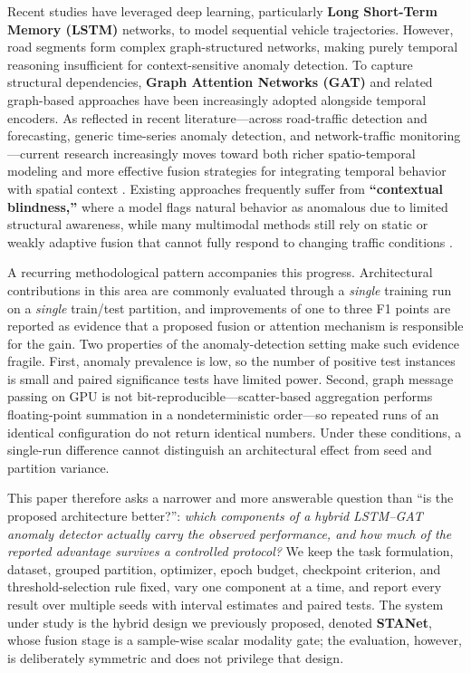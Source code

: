 \documentclass[journal]{IEEEtran}
\begin{document}
Recent studies have leveraged deep learning, particularly \textbf{Long Short-Term Memory (LSTM)} networks, to model sequential vehicle trajectories. However, road segments form complex graph-structured networks, making purely temporal reasoning insufficient for context-sensitive anomaly detection. To capture structural dependencies, \textbf{Graph Attention Networks (GAT)} and related graph-based approaches have been increasingly adopted alongside temporal encoders. As reflected in recent literature---across road-traffic detection and forecasting, generic time-series anomaly detection, and network-traffic monitoring---current research increasingly moves toward both richer spatio-temporal modeling and more effective fusion strategies for integrating temporal behavior with spatial context \cite{huang_multivariate_2024, sun_framework_2025, nguyen_spatiotemporal_2026, liang_anomaly_2025}. Existing approaches frequently suffer from \textbf{``contextual blindness,''} where a model flags natural behavior as anomalous due to limited structural awareness, while many multimodal methods still rely on static or weakly adaptive fusion that cannot fully respond to changing traffic conditions \cite{sun_framework_2025, liang_anomaly_2025}.

A recurring methodological pattern accompanies this progress. Architectural contributions in this area are commonly evaluated through a \emph{single} training run on a \emph{single} train/test partition, and improvements of one to three F1 points are reported as evidence that a proposed fusion or attention mechanism is responsible for the gain. Two properties of the anomaly-detection setting make such evidence fragile. First, anomaly prevalence is low, so the number of positive test instances is small and paired significance tests have limited power. Second, graph message passing on GPU is not bit-reproducible---scatter-based aggregation performs floating-point summation in a nondeterministic order---so repeated runs of an identical configuration do not return identical numbers. Under these conditions, a single-run difference cannot distinguish an architectural effect from seed and partition variance.

This paper therefore asks a narrower and more answerable question than ``is the proposed architecture better?'': \emph{which components of a hybrid LSTM--GAT anomaly detector actually carry the observed performance, and how much of the reported advantage survives a controlled protocol?} We keep the task formulation, dataset, grouped partition, optimizer, epoch budget, checkpoint criterion, and threshold-selection rule fixed, vary one component at a time, and report every result over multiple seeds with interval estimates and paired tests. The system under study is the hybrid design we previously proposed, denoted \textbf{STANet}, whose fusion stage is a sample-wise scalar modality gate; the evaluation, however, is deliberately symmetric and does not privilege that design.
\end{document}
